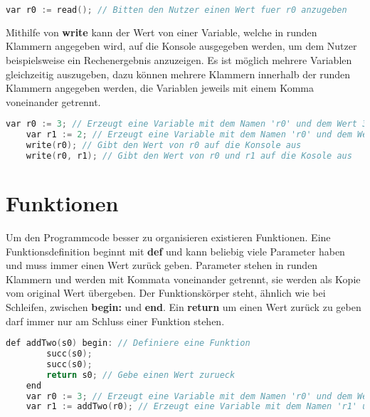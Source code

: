 \begin{lstlisting}[language=c, caption=read in While, label={lst:while-var-defdec}]
	var r0 := read(); // Bitten den Nutzer einen Wert fuer r0 anzugeben
\end{lstlisting}

Mithilfe von \textbf{write} kann der Wert von einer Variable, welche in runden Klammern angegeben wird, auf die Konsole ausgegeben werden, um dem Nutzer beispielsweise ein Rechenergebnis anzuzeigen. Es ist möglich mehrere Variablen gleichzeitig auszugeben, dazu können mehrere Klammern innerhalb der runden Klammern angegeben werden, die Variablen jeweils mit einem Komma voneinander getrennt. 

\begin{lstlisting}[language=c, caption=write in While, label={lst:while-var-defdec}]
	var r0 := 3; // Erzeugt eine Variable mit dem Namen 'r0' und dem Wert 3
	var r1 := 2; // Erzeugt eine Variable mit dem Namen 'r0' und dem Wert 3
	write(r0); // Gibt den Wert von r0 auf die Konsole aus
	write(r0, r1); // Gibt den Wert von r0 und r1 auf die Kosole aus
\end{lstlisting}

\section{Funktionen}
Um den Programmcode besser zu organisieren existieren Funktionen. Eine Funktionsdefinition beginnt mit \textbf{def} und kann beliebig viele Parameter haben und muss immer einen Wert zurück geben. Parameter stehen in runden Klammern und werden mit Kommata voneinander getrennt, sie werden als Kopie vom original Wert übergeben. Der Funktionskörper steht, ähnlich wie bei Schleifen, zwischen \textbf{begin:} und \textbf{end}. Ein \textbf{return} um einen Wert zurück zu geben darf immer nur am Schluss einer Funktion stehen. 

\begin{lstlisting}[language=c, caption=Funktionen in While, label={lst:while-var-defdec}]
	def addTwo(s0) begin: // Definiere eine Funktion
		succ(s0);
		succ(s0);
		return s0; // Gebe einen Wert zurueck
	end
	var r0 := 3; // Erzeugt eine Variable mit dem Namen 'r0' und dem Wert 3
	var r1 := addTwo(r0); // Erzeugt eine Variable mit dem Namen 'r1' und dem Wert von addTwo(r0)
\end{lstlisting}